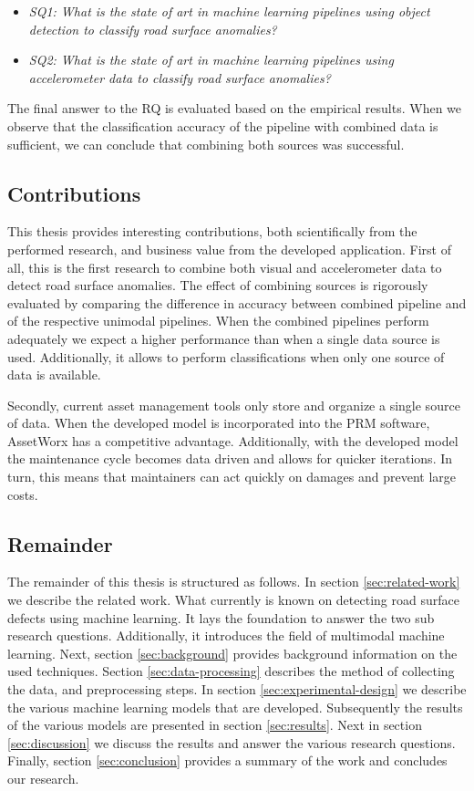 \begin{itemize}
\item \textit{SQ1: What is the state of art in machine learning pipelines using object detection to classify road surface anomalies?}
\item \textit{SQ2: What is the state of art in machine learning pipelines using accelerometer data to classify road surface anomalies?}
\end{itemize}

The final answer to the RQ is evaluated based on the empirical results. When we observe that the classification accuracy of the pipeline with combined data is sufficient, we can conclude that combining both sources was successful.


\subsection{Contributions}

This thesis provides interesting contributions, both scientifically from the performed research, and business value from the developed application. First of all, this is the first research to combine both visual and accelerometer data to detect road surface anomalies. The effect of combining sources is rigorously evaluated by comparing the difference in accuracy between combined pipeline and of the respective unimodal pipelines. When the combined pipelines perform adequately we expect a higher performance than when a single data source is used. Additionally, it allows to perform classifications when only one source of data is available. 

Secondly, current asset management tools only store and organize a single source of data. When the developed model is incorporated into the PRM software, AssetWorx has a competitive advantage. Additionally, with the developed model the maintenance cycle becomes data driven and allows for quicker iterations. In turn, this means that maintainers can act quickly on damages and prevent large costs.

\subsection{Remainder}

The remainder of this thesis is structured as follows. In section \ref{sec:related-work} we describe the related work. What currently is known on detecting road surface defects using machine learning. It lays the foundation to answer the two sub research questions. Additionally, it introduces the field of multimodal machine learning. Next, section \ref{sec:background} provides background information on the used techniques. Section \ref{sec:data-processing} describes the method of collecting the data, and preprocessing steps. In section \ref{sec:experimental-design} we describe the various machine learning models that are developed. Subsequently the results of the various models are presented in section \ref{sec:results}. Next in section \ref{sec:discussion} we discuss the results and answer the various research questions. Finally, section \ref{sec:conclusion} provides a summary of the work and concludes our research.

